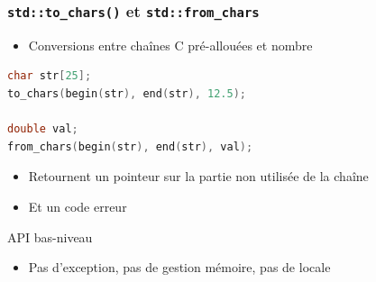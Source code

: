 \documentclass[C++.tex]{subfiles}
\begin{document}
\begin{frame}[fragile]
	\frametitle{\lstinline|std::to_chars()| et \lstinline|std::from_chars|}
	\begin{itemize}
		\item Conversions entre chaînes C pré-allouées et nombre
	\end{itemize}
	
	\begin{lstlisting}[language=C++]
char str[25];
to_chars(begin(str), end(str), 12.5);

double val;
from_chars(begin(str), end(str), val);\end{lstlisting}

	\begin{itemize}
		\item Retournent un pointeur sur la partie non utilisée de la chaîne


		\item Et un code erreur
	\end{itemize}

	\begin{alertblock}{API bas-niveau}
		\begin{itemize}
			\item Pas d'exception, pas de gestion mémoire, pas de locale
		\end{itemize}
	\end{alertblock}
\end{frame}
\end{document}
